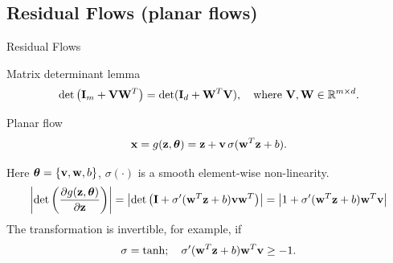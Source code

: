 \documentclass{beamer}
\begin{document}
\subsection{Residual Flows (planar flows)}
\begin{frame}{Residual Flows}
	\begin{block}{Matrix determinant lemma}
		\vspace{-0.5cm}
		\[
		\det \left( \mathbf{I}_m + \mathbf{V} \mathbf{W}^T \right) = \det ( \mathbf{I}_d + \mathbf{W}^T \mathbf{V} ), \quad \text{where } \mathbf{V}, \mathbf{W} \in \mathbb{R}^{m \times d}.
		\]
		\vspace{-0.5cm}
	\end{block}
	\begin{block}{Planar flow}
		\vspace{-0.2cm}
		\[
		\mathbf{x} = g(\mathbf{z}, \boldsymbol{\theta}) = \mathbf{z} + \mathbf{v} \, \sigma(\mathbf{w}^T\mathbf{z} + b).
		\]
		\vspace{-0.3cm}
	\end{block}
	Here $\boldsymbol{\theta} = \{\mathbf{v}, \mathbf{w}, b\}$, $\sigma(\cdot)$ is a smooth element-wise non-linearity.
	{\small
		\[
		\left| \det \left( \frac{\partial g(\mathbf{z}, \boldsymbol{\theta})}{\partial \mathbf{z}} \right)\right| = \left| \det \left( \mathbf{I} + \sigma'(\mathbf{w}^T \mathbf{z} + b) \mathbf{v} \mathbf{w}^T\right) \right| = \left| 1 + \sigma'(\mathbf{w}^T \mathbf{z} + b) \mathbf{w}^T \mathbf{v} \right|
		\]}
	The transformation is invertible, for example, if
	\[
	\sigma = \tanh; \quad \sigma'(\mathbf{w}^T \mathbf{z} + b) \mathbf{w}^T \mathbf{v} \geq -1.
	\]
\end{frame}
\end{document}
